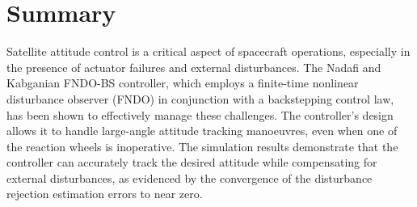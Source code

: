 \newpage
\section{Summary}
Satellite attitude control is a critical aspect of spacecraft operations, especially in the presence of actuator failures and external disturbances. The Nadafi and Kabganian FNDO-BS controller, which employs a finite-time nonlinear disturbance observer (FNDO) in conjunction with a backstepping control law, has been shown to effectively manage these challenges.
The controller's design allows it to handle large-angle attitude tracking manoeuvres, even when one of the reaction wheels is inoperative. The simulation results demonstrate that the controller can accurately track the desired attitude while compensating for external disturbances, as evidenced by the convergence of the disturbance rejection estimation errors to near zero.









